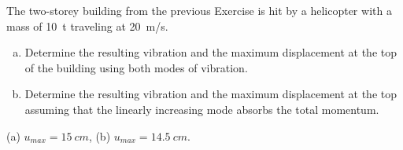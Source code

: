 
\begin{Exercise}[label={two_storey_helicopter}]
The two-storey building from the previous Exercise is hit by a helicopter with a mass of \SI{10}{t} traveling at \SI{20}{m/s}.
\begin{enumerate}[(a)]
    \item Determine the resulting vibration and the maximum displacement at the top of the building using both modes of vibration.
    \item Determine the resulting vibration and the maximum displacement at the top assuming that the linearly increasing mode absorbs the total momentum.
\end{enumerate}
\shortAnswer (a) $u_{max} = \SI{15}{cm}$, (b) $u_{max} = \SI{14.5}{cm}$.
\end{Exercise}



